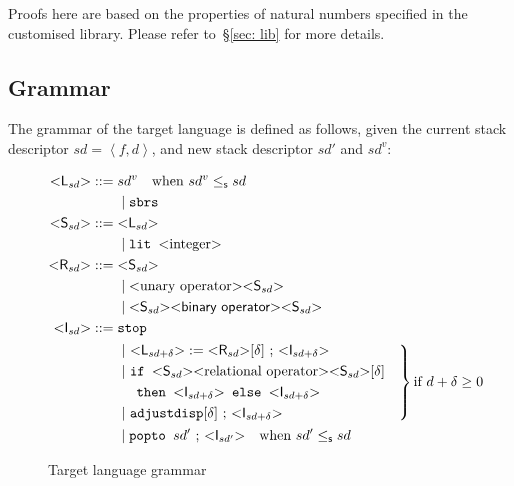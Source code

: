\documentclass[12pt,a4paper]{report}
\theoremstyle{definition}
\newcommand{\secref}[1]{\S\ref{#1}}
\newcommand{\bracket}[1]{\mathord{<} #1 \mathord{>}}
\newcommand{\ang}[1]{\left\langle #1 \right\rangle}
\begin{document}
    Proofs here are based on the properties of natural numbers specified in the customised library. Please refer to~\secref{sec: lib} for more details.

    \subsection{Grammar}
    The grammar of the target language is defined as follows, given the current stack descriptor $sd = \ang{f, d}$, and new stack descriptor $sd'$ and $sd^v$:
    \begin{figure}[H]
        \centering
        \[\begin{aligned}
            \bracket{\textsf{L}_{sd}} ::={}& sd^v \quad \text{when } sd^v \leq_\mathsf{s} sd \\
                            &\mid \texttt{sbrs}  \\
            \bracket{\textsf{S}_{sd}} ::={}& \bracket{\textsf{L}_{sd}} \\
                            &\mid \texttt{lit } \bracket{\text{integer}} \\
            \bracket{\textsf{R}_{sd}} ::={}& \bracket{\textsf{S}_{sd}} \\
                            &\mid \bracket{ \text{unary operator} } \bracket{ \textsf{S}_{sd}}\\
                            &\mid \bracket{\textsf{S}_{sd}} \bracket{\textsf{binary operator}} \bracket{ \textsf{S}_{sd} } \\
            \bracket{\textsf{I}_{sd}} ::={}& \texttt{stop} \\
                            &\left.
                            \begin{aligned}
                            &|{\ } \bracket{\textsf{L}_{sd+\delta}} := \bracket{\textsf{R}_{sd}}[\delta] \text{ ; } \bracket{\textsf{I}_{sd+\delta}} \\
                            &|{\ } \texttt{if } \bracket{\textsf{S}_{sd}} \bracket{\text{relational operator}} \bracket{\textsf{S}_{sd}}[\delta] \\
                            & \hphantom{\mid {}} \texttt{ then } \bracket{\textsf{I}_{sd+\delta}} \texttt{ else } \bracket{\textsf{I}_{sd+\delta}} \\
                            &|{\ } \texttt{adjustdisp} [\delta] \text{ ; } \bracket{\textsf{I}_{sd+\delta}} \\
                            \end{aligned}
                            \quad \right\} \text{if } d + \delta \geq 0  \\
                            &{}\mid{} \texttt{popto } sd' \text{ ; } \bracket{\textsf{I}_{sd'}} \quad \text{when } sd' \leq_\mathsf{s} sd \\
        \end{aligned}\]
        \caption{Target language grammar}
        \label{fig: target_grammar}
    \end{figure}
\end{document}
